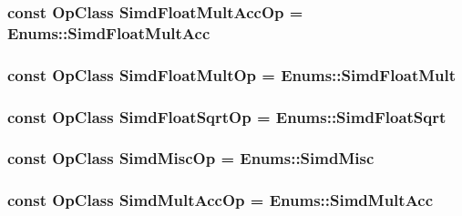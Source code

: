 \label{op__class_8hh_ab275354d1f1f0f4fef21d3b14eeaed98}
\hypertarget{op__class_8hh_a88b1ac8de22c537899fc9ec8ee39cd05}{
\subsubsection[{SimdFloatMultAccOp}]{\setlength{\rightskip}{0pt plus 5cm}const OpClass {\bf SimdFloatMultAccOp} = Enums::SimdFloatMultAcc}}
\label{op__class_8hh_a88b1ac8de22c537899fc9ec8ee39cd05}
\hypertarget{op__class_8hh_a00ad99c4a6c35f8c4d6ea15aee0d770d}{
\subsubsection[{SimdFloatMultOp}]{\setlength{\rightskip}{0pt plus 5cm}const OpClass {\bf SimdFloatMultOp} = Enums::SimdFloatMult}}
\label{op__class_8hh_a00ad99c4a6c35f8c4d6ea15aee0d770d}
\hypertarget{op__class_8hh_a651924a5d79428b05017beb253576ad4}{
\subsubsection[{SimdFloatSqrtOp}]{\setlength{\rightskip}{0pt plus 5cm}const OpClass {\bf SimdFloatSqrtOp} = Enums::SimdFloatSqrt}}
\label{op__class_8hh_a651924a5d79428b05017beb253576ad4}
\hypertarget{op__class_8hh_ae09ebfb90b2ddeeac91e32bf54b3519a}{
\subsubsection[{SimdMiscOp}]{\setlength{\rightskip}{0pt plus 5cm}const OpClass {\bf SimdMiscOp} = Enums::SimdMisc}}
\label{op__class_8hh_ae09ebfb90b2ddeeac91e32bf54b3519a}
\hypertarget{op__class_8hh_a4c479e9bffd76c1d55b04744fe786e66}{
\subsubsection[{SimdMultAccOp}]{\setlength{\rightskip}{0pt plus 5cm}const OpClass {\bf SimdMultAccOp} = Enums::SimdMultAcc}}
